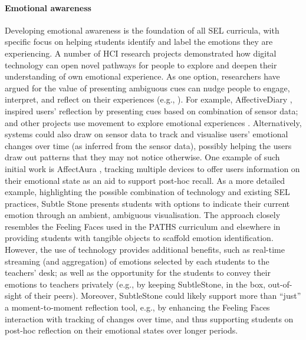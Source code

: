 \documentclass[prodmode,acmtochi]{acmsmall}
\begin{document}
        \paragraph{Emotional awareness}
        \label{sec:emaware}
Developing emotional awareness is the foundation of all SEL curricula, with specific focus on helping students identify and label the emotions they are experiencing. A number of HCI research projects demonstrated how digital technology can open novel pathways for people to explore and deepen their understanding of own emotional experience. As one option, researchers have argued for the value of presenting ambiguous cues can nudge people to engage, interpret, and reflect on their experiences (e.g., \cite{Boehner2005,Gaver2003}). For example, AffectiveDiary  \cite{Stahl2008,Sengers2007,Hook2008}, inspired users' reflection by presenting  cues based on combination of sensor data; and other projects use movement to explore emotional experiences \cite{Mentis2014}.  
Alternatively, systems could also draw on sensor data to track and visualise users' emotional changes over time (as inferred from the sensor data), possibly helping the users draw out patterns that they may not notice otherwise. One example of such initial work is AffectAura \cite{McDuff2012}, tracking multiple devices to offer users information on their emotional state as an aid to support post-hoc recall. 
%
As a more detailed example, highlighting the possible combination of technology and existing SEL practices, Subtle Stone \cite{Balaam2010} presents students with options to indicate their current emotion through an ambient, ambiguous visualisation. The approach closely resembles the Feeling Faces used in the PATHS curriculum and elsewhere in providing students with tangible objects to scaffold emotion identification. However, the use of technology provides additional benefits, such as real-time streaming (and aggregation) of emotions selected by each students to the teachers' desk; as well as the opportunity for the students to convey their emotions to teachers privately (e.g., by keeping SubtleStone, in the box, out-of-sight of their peers). Moreover, SubtleStone could likely support more than ``just'' a moment-to-moment reflection tool, e.g., by enhancing the Feeling Faces interaction with tracking of changes over time, and thus supporting students on post-hoc reflection on their emotional states over longer periods.

%

\end{document}
